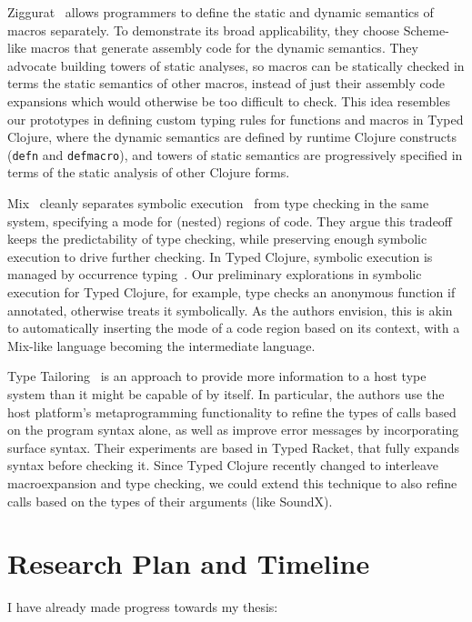 \documentclass[9pt]{extarticle}
\begin{document}
Ziggurat~\cite{Fisher06staticanalysis} allows programmers to define
the static and dynamic semantics of macros separately. To demonstrate its
broad applicability, they choose Scheme-like macros that generate assembly code
for the dynamic semantics.
They advocate building towers of static analyses, so
macros can be statically checked in terms the static semantics of other macros, instead
of just their assembly code expansions which would otherwise be too difficult to check.
This idea resembles our prototypes in defining custom typing rules for functions and macros in Typed Clojure,
where the dynamic semantics are defined by runtime Clojure constructs (\texttt{defn}
and \texttt{defmacro}), and towers of static semantics are progressively specified in terms of the static
analysis of other Clojure forms.

Mix~\cite{Khoo2010MTC} cleanly separates symbolic execution~\cite{King1976SEP} from type checking
in the same system, specifying a mode for (nested) regions of code.
They argue this tradeoff keeps the predictability of type checking, while preserving enough
symbolic execution to drive further checking.
In Typed Clojure, symbolic execution is managed by occurrence typing~\cite{TF10}.
Our preliminary explorations in symbolic execution for Typed Clojure, for example, type checks an
anonymous function if annotated, otherwise treats it symbolically.
As the authors envision, this is akin to automatically inserting
the mode of a code region based on its context, with a Mix-like language
becoming the intermediate language.

Type Tailoring~\cite{greenmanttailoring} is an approach to provide more information
to a host type system than it might be capable of by itself.
In particular, the authors use the host platform's metaprogramming functionality
to refine the types of calls based on the program syntax alone, as well as improve
error messages by incorporating surface syntax. Their experiments are based in Typed Racket, that fully expands
syntax before checking it. Since Typed Clojure recently changed to interleave macroexpansion
and type checking, we could extend this technique to also refine calls based on the
types of their arguments (like SoundX).

\section{Research Plan and Timeline}

I have already made progress towards my thesis:
\end{document}
